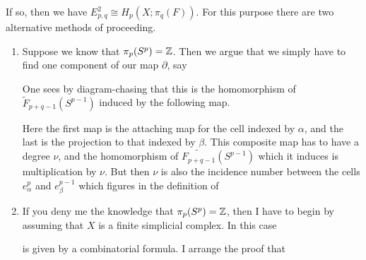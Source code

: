 \documentclass[../main]{subfiles}
\begin{document}
If so, then we have $E_{p,q}^2\cong H_p(X;\pi_q(F))$. For this purpose there are two alternative methods of proceeding.
\begin{enumerate}[label=(\roman*)]
    \item Suppose we know that $\pi_p(S^p)=\mathbb{Z}$. Then we argue that we simply have to find one component of our map $\partial$, say
    \begin{center}
    \end{center}
    One sees by diagram-chasing that this is the homomorphism of $\tilde{F}_{p+q-1}(S^{p-1})$ induced by the following map.
    \begin{center}
    \end{center}
    Here the first map is the attaching map for the cell indexed by $\alpha$, and the last is the projection to that indexed by $\beta$. This composite map has to have a degree $\nu$, and the homomorphism of $\widetilde{F_{p+q-1}}(S^{p-1})$ which it induces is multiplication by $\nu$. But then $\nu$ is also the incidence number between the cells $e_{\alpha}^p$ and $e_{\beta}^{p-1}$ which figures in the definition of \begin{center}
    \end{center}
    \item If you deny me the knowledge that $\pi_p(S^p)=\mathbb{Z}$, then I have to begin by assuming that $X$ is a finite simplicial complex. In this case 
    \begin{center}
    \end{center}
    is given by a combinatorial formula. I arrange the proof that

\end{enumerate}
\end{document}
